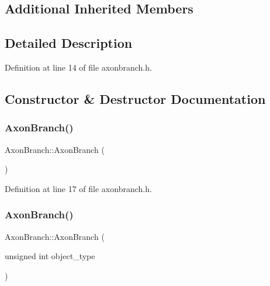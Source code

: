 \subsection*{Additional Inherited Members}


\subsection{Detailed Description}


Definition at line 14 of file axonbranch.\+h.



\subsection{Constructor \& Destructor Documentation}
\mbox{\label{class_axon_branch_a5bb6ccef8d94c937a85148af932221c0}} 
\subsubsection{\texorpdfstring{Axon\+Branch()}{AxonBranch()}\hspace{0.1cm}{\footnotesize\ttfamily [1/4]}}
{\footnotesize\ttfamily Axon\+Branch\+::\+Axon\+Branch (\begin{DoxyParamCaption}{ }\end{DoxyParamCaption})\hspace{0.3cm}{\ttfamily [inline]}}



Definition at line 17 of file axonbranch.\+h.

\mbox{\label{class_axon_branch_a67618605ac3731556ab48a6583e21ba8}} 
\subsubsection{\texorpdfstring{Axon\+Branch()}{AxonBranch()}\hspace{0.1cm}{\footnotesize\ttfamily [2/4]}}
{\footnotesize\ttfamily Axon\+Branch\+::\+Axon\+Branch (\begin{DoxyParamCaption}\item[{unsigned int}]{object\+\_\+type }\end{DoxyParamCaption})\hspace{0.3cm}{\ttfamily [inline]}}



